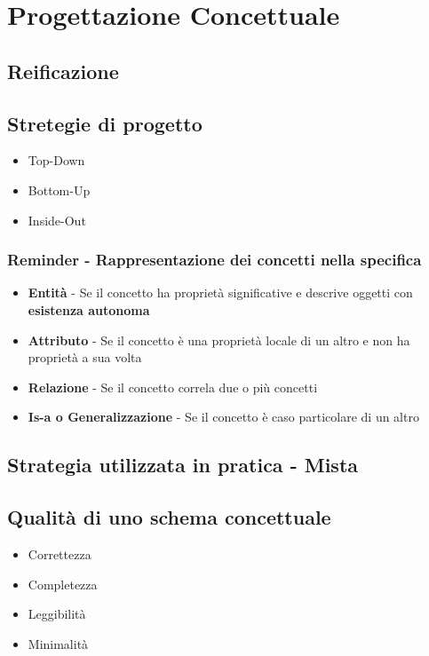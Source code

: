 \chapter{Progettazione Concettuale}
\section{Reificazione}
\section{Stretegie di progetto}
\begin{itemize}
    \item Top-Down
    \item Bottom-Up
    \item Inside-Out
\end{itemize}
\subsection*{Reminder - Rappresentazione dei concetti nella specifica}
\begin{itemize}
    \item \textbf{Entità} - Se il concetto ha proprietà significative e descrive oggetti 
    con \textbf{esistenza autonoma}
    \item \textbf{Attributo} - Se il concetto è una proprietà locale di un altro e non ha
    proprietà a sua volta
    \item \textbf{Relazione} - Se il concetto correla due o più concetti
    \item \textbf{Is-a o Generalizzazione} - Se il concetto è caso particolare di un altro
\end{itemize}
\section{Strategia utilizzata in pratica - Mista}

\section{Qualità di uno schema concettuale}
\begin{itemize}
    \item Correttezza
    \item Completezza
    \item Leggibilità
    \item Minimalità
\end{itemize}
